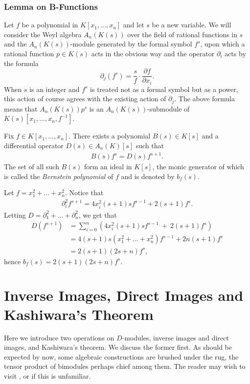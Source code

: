 \subsubsection{Lemma on B-Functions}
Let $f$ be a polynomial in $K[x_1,...,x_n]$ and let $s$ be a new variable. We will consider the Weyl algebra $A_n(K(s))$ over the field of rational functions in $s$ and the $A_n(K(s))$-module generated by the formal symbol $f^s$, upon which a rational function $p \in K(s)$ acts in the obvious way and the operator $\partial_i$ acts by the formula
\begin{equation}\label{eqn:formula-preceeding-b-func}
	\partial_j\left(f^s\right) = \frac{s}{f}\cdot \frac{\partial f}{\partial x_i}.
\end{equation}
When $s$ is an integer and $f^s$ is treated not as a formal symbol but as a power, this action of course agrees with the existing action of $\partial_j$. The above formula means that $A_n(K(s))p^s$ is an $A_n(K(s))$-submodule of $K(s)[x_1,...,x_n,f^{-1}]$.

\begin{thm}\label{thm:b-functions-Weyl}
	Fix $f \in K[x_1,...,x_n]$. There exists a polynomial $B(s) \in K[s]$ and a differential operator $D(s)\in A_n(K)[s]$ such that
	\begin{align*}
		B(s)f^s = D(s) f^{s+1}.
	\end{align*}
	The set of all such $B(s)$ form an ideal in $K[s]$, the monic generator of which is called the \emph{Bernstein polynomial} of $f$ and is denoted by $b_f(s)$.
\end{thm}
\begin{example}\label{example:explicit-b-function1}
	Let $f = x_1^2+...+x_n^2$. Notice that
	\begin{align*}
		\partial_i^2 f^{s+1} = 4x_i^2(s+1)sf^{s-1} + 2(s+1)f^s.
	\end{align*}
	Letting $D = \partial_1^2 + ... + \partial_n^2$, we get that
	\begin{align*}
		D(f^{s+1})
		  &= \sum_{i=0}^n \left(4x_i^2(s+1)sf^{s-1} ~+~ 2(s+1)f^s\right) \\
		  &= 4(s+1)s(x_1^2+...+x_n^2)f^{s-1} + 2n(s+1)f^s \\
		  &= 2(s+1)(2s+ n)f^s,
	\end{align*}
	hence $b_f(s) = 2(s+1)(2s+n)f^s$.
\end{example}

\section{Inverse Images, Direct Images and Kashiwara's Theorem}
Here we introduce two operations on $D$-modules, inverse images and direct images, and Kashiwara's theorem. We discuss the former first. As should be expected by now, some algebraic constructions are brushed under the rug, the tensor product of bimodules perhaps chief among them. The reader may wish to visit \cite{d-mod-primer}, \cite{d-mod_ps-rt} or \cite{ginzburg_d-mod} if this is unfamiliar.

